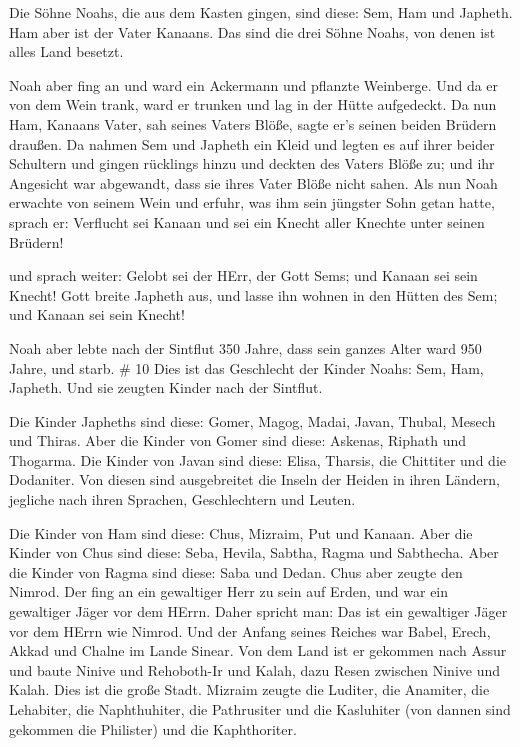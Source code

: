  Die Söhne Noahs, die aus dem Kasten gingen, sind diese:
Sem, Ham und Japheth. Ham aber ist der Vater Kanaans.  Das
sind die drei Söhne Noahs, von denen ist alles Land besetzt.

 Noah aber fing an und ward ein Ackermann und pflanzte
Weinberge.  Und da er von dem Wein trank, ward er trunken
und lag in der Hütte aufgedeckt.  Da nun Ham, Kanaans
Vater, sah seines Vaters Blöße, sagte er's seinen beiden Brüdern
draußen.  Da nahmen Sem und Japheth ein Kleid und legten es
auf ihrer beider Schultern und gingen rücklings hinzu und deckten des
Vaters Blöße zu; und ihr Angesicht war abgewandt, dass sie ihres Vater
Blöße nicht sahen.  Als nun Noah erwachte von seinem Wein
und erfuhr, was ihm sein jüngster Sohn getan hatte,  sprach
er: Verflucht sei Kanaan und sei ein Knecht aller Knechte unter seinen
Brüdern!

 und sprach weiter: Gelobt sei der HErr, der Gott Sems; und
Kanaan sei sein Knecht!  Gott breite Japheth aus, und lasse
ihn wohnen in den Hütten des Sem; und Kanaan sei sein Knecht!

 Noah aber lebte nach der Sintflut 350 Jahre, 
dass sein ganzes Alter ward 950 Jahre, und starb. \# 10 
Dies ist das Geschlecht der Kinder Noahs: Sem, Ham, Japheth. Und sie
zeugten Kinder nach der Sintflut.

 Die Kinder Japheths sind diese: Gomer, Magog, Madai, Javan,
Thubal, Mesech und Thiras.  Aber die Kinder von Gomer sind
diese: Askenas, Riphath und Thogarma.  Die Kinder von Javan
sind diese: Elisa, Tharsis, die Chittiter und die Dodaniter.
 Von diesen sind ausgebreitet die Inseln der Heiden in ihren
Ländern, jegliche nach ihren Sprachen, Geschlechtern und Leuten.

 Die Kinder von Ham sind diese: Chus, Mizraim, Put und
Kanaan.  Aber die Kinder von Chus sind diese: Seba, Hevila,
Sabtha, Ragma und Sabthecha. Aber die Kinder von Ragma sind diese: Saba
und Dedan.  Chus aber zeugte den Nimrod. Der fing an ein
gewaltiger Herr zu sein auf Erden,  und war ein gewaltiger
Jäger vor dem HErrn. Daher spricht man: Das ist ein gewaltiger Jäger vor
dem HErrn wie Nimrod.  Und der Anfang seines Reiches war
Babel, Erech, Akkad und Chalne im Lande Sinear.  Von dem
Land ist er gekommen nach Assur und baute Ninive und Rehoboth-Ir und
Kalah,  dazu Resen zwischen Ninive und Kalah. Dies ist die
große Stadt.  Mizraim zeugte die Luditer, die Anamiter, die
Lehabiter, die Naphthuhiter,  die Pathrusiter und die
Kasluhiter (von dannen sind gekommen die Philister) und die
Kaphthoriter.

